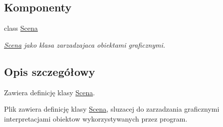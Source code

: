 \subsection*{Komponenty}
\begin{DoxyCompactItemize}
\item 
class \hyperlink{classScena}{Scena}
\begin{DoxyCompactList}\small\item\em \hyperlink{classScena}{Scena} jako klasa zarzadzajaca obiektami graficznymi. \end{DoxyCompactList}\end{DoxyCompactItemize}


\subsection{Opis szczegółowy}
Zawiera definicję klasy \hyperlink{classScena}{Scena}. 

Plik zawiera definicję klasy \hyperlink{classScena}{Scena}, sluzacej do zarzadzania graficznymi interpretacjami obiektow wykorzystywanych przez program. 